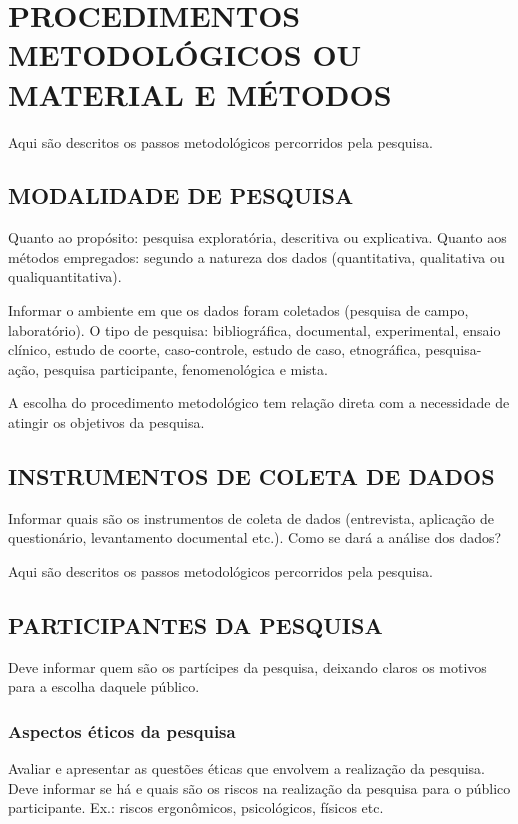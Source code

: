 \section{PROCEDIMENTOS METODOLÓGICOS OU MATERIAL E MÉTODOS}
Aqui são descritos os passos metodológicos percorridos pela pesquisa.

\subsection{MODALIDADE DE PESQUISA}
Quanto ao propósito: pesquisa exploratória, descritiva ou explicativa. Quanto aos métodos empregados: segundo a natureza dos dados (quantitativa, qualitativa ou qualiquantitativa).

Informar o ambiente em que os dados foram coletados (pesquisa de campo, laboratório). O tipo de pesquisa: bibliográfica, documental, experimental, ensaio clínico, estudo de coorte, caso-controle, estudo de caso, etnográfica, pesquisa-ação, pesquisa participante, fenomenológica e mista. \cite{gil2017}

A escolha do procedimento metodológico tem relação direta com a necessidade de atingir os objetivos da pesquisa.

\subsection{INSTRUMENTOS DE COLETA DE DADOS}
Informar quais são os instrumentos de coleta de dados (entrevista, aplicação de questionário, levantamento documental etc.). Como se dará a análise dos dados?

Aqui são descritos os passos metodológicos percorridos pela pesquisa.

\subsection{PARTICIPANTES DA PESQUISA}
Deve informar quem são os partícipes da pesquisa, deixando claros os motivos para a escolha daquele público.

\subsubsection{Aspectos éticos da pesquisa}
Avaliar e apresentar as questões éticas que envolvem a realização da pesquisa. Deve informar se há e quais são os riscos na realização da pesquisa para o público participante. Ex.: riscos ergonômicos, psicológicos, físicos etc.